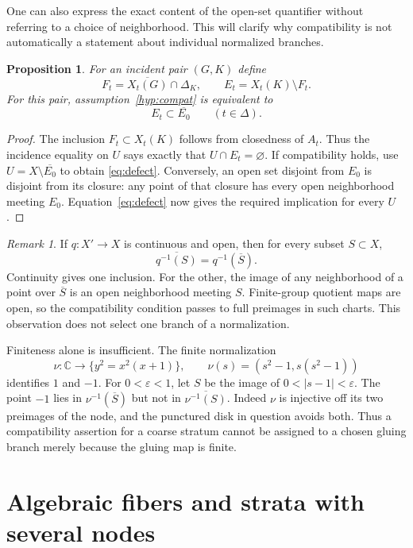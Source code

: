 \documentclass[11pt]{article}
\newcommand{\C}{\mathbb C}
\newcommand{\cl}[1]{\overline{#1}}
\newtheorem{proposition}[theorem]{Proposition}
\theoremstyle{definition}
\theoremstyle{remark}
\newtheorem{remark}[theorem]{Remark}
\begin{document}
One can also express the exact content of the open-set quantifier without referring to a choice of neighborhood. This will clarify why compatibility is not automatically a statement about individual normalized branches.

\begin{proposition}\label{prop:defect}
For an incident pair $(G,K)$ define
\[
 F_t=\cl{X_t(G)}\cap\Delta_K,\qquad
 E_t=X_t(K)\setminus F_t.
\]
For this pair, assumption~\ref{hyp:compat} is equivalent to
\begin{equation}\label{eq:defect}
 E_t\subset\cl{E_0}\qquad(t\in\Delta).
\end{equation}
\end{proposition}

\begin{proof}
The inclusion $F_t\subset X_t(K)$ follows from closedness of $A_t$. Thus the incidence equality on $U$ says exactly that $U\cap E_t=\varnothing$. If compatibility holds, use $U=X\setminus\cl{E_0}$ to obtain \eqref{eq:defect}. Conversely, an open set disjoint from $E_0$ is disjoint from its closure: any point of that closure has every open neighborhood meeting $E_0$. Equation~\eqref{eq:defect} now gives the required implication for every $U$.
\end{proof}

\begin{remark}\label{rem:branches}
If $q:X'\to X$ is continuous and open, then for every subset $S\subset X$,
\[
 \cl{q^{-1}(S)}=q^{-1}(\cl S).
\]
Continuity gives one inclusion. For the other, the image of any neighborhood of a point over $\cl S$ is an open neighborhood meeting $S$. Finite-group quotient maps are open, so the compatibility condition passes to full preimages in such charts. This observation does not select one branch of a normalization.

Finiteness alone is insufficient. The finite normalization
\[
 \nu:\C\longrightarrow\{y^2=x^2(x+1)\},\qquad
 \nu(s)=(s^2-1,s(s^2-1))
\]
identifies $1$ and $-1$. For $0<\varepsilon<1$, let $S$ be the image of $0<|s-1|<\varepsilon$. The point $-1$ lies in $\nu^{-1}(\cl S)$ but not in $\cl{\nu^{-1}(S)}$. Indeed $\nu$ is injective off its two preimages of the node, and the punctured disk in question avoids both. Thus a compatibility assertion for a coarse stratum cannot be assigned to a chosen gluing branch merely because the gluing map is finite.
\end{remark}

\section{Algebraic fibers and strata with several nodes}\label{sec:algebraic}
\end{document}
